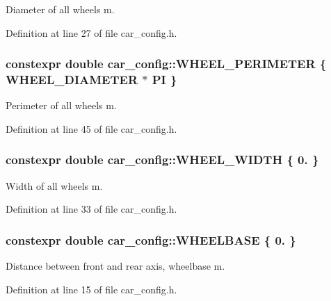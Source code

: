 Diameter of all wheels  m. 



Definition at line 27 of file car\+\_\+config.\+h.

\subsubsection[{\texorpdfstring{W\+H\+E\+E\+L\+\_\+\+P\+E\+R\+I\+M\+E\+T\+ER}{WHEEL_PERIMETER}}]{\setlength{\rightskip}{0pt plus 5cm}constexpr double car\+\_\+config\+::\+W\+H\+E\+E\+L\+\_\+\+P\+E\+R\+I\+M\+E\+T\+ER \{ {\bf W\+H\+E\+E\+L\+\_\+\+D\+I\+A\+M\+E\+T\+ER} $\ast$ {\bf PI} \}}\hypertarget{namespacecar__config_a46fe00906da07d2e030b586a634cd907}{}\label{namespacecar__config_a46fe00906da07d2e030b586a634cd907}


Perimeter of all wheels  m. 



Definition at line 45 of file car\+\_\+config.\+h.

\subsubsection[{\texorpdfstring{W\+H\+E\+E\+L\+\_\+\+W\+I\+D\+TH}{WHEEL_WIDTH}}]{\setlength{\rightskip}{0pt plus 5cm}constexpr double car\+\_\+config\+::\+W\+H\+E\+E\+L\+\_\+\+W\+I\+D\+TH \{ 0. \}}\hypertarget{namespacecar__config_ace29186cd9605cde6edd0fd9b814df63}{}\label{namespacecar__config_ace29186cd9605cde6edd0fd9b814df63}


Width of all wheels  m. 



Definition at line 33 of file car\+\_\+config.\+h.

\subsubsection[{\texorpdfstring{W\+H\+E\+E\+L\+B\+A\+SE}{WHEELBASE}}]{\setlength{\rightskip}{0pt plus 5cm}constexpr double car\+\_\+config\+::\+W\+H\+E\+E\+L\+B\+A\+SE \{ 0. \}}\hypertarget{namespacecar__config_a4e9e4925d43a88de91b13bedafabce67}{}\label{namespacecar__config_a4e9e4925d43a88de91b13bedafabce67}


Distance between front and rear axis, wheelbase  m. 



Definition at line 15 of file car\+\_\+config.\+h.

